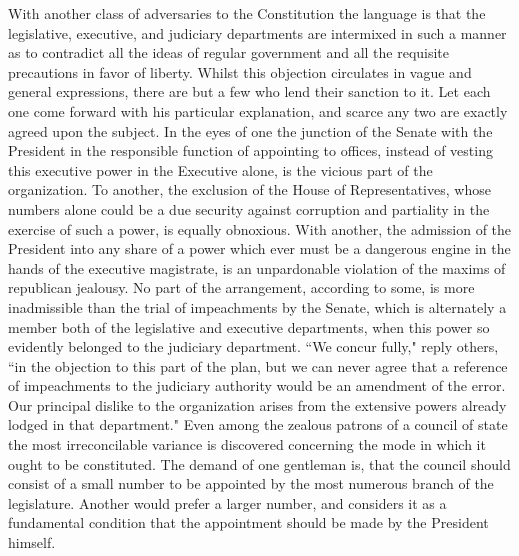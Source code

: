 With another class of adversaries to the Constitution the language is that the legislative, executive, and judiciary departments are intermixed in such a manner as to contradict all the ideas of regular government and all the requisite precautions in favor of liberty. 
Whilst this objection circulates in vague and general expressions, there are but a few who lend their sanction to it. 
Let each one come forward with his particular explanation, and scarce any two are exactly agreed upon the subject. 
In the eyes of one the junction of the Senate with the President in the responsible function of appointing to offices, instead of vesting this executive power in the Executive alone, is the vicious part of the organization. 
To another, the exclusion of the House of Representatives, whose numbers alone could be a due security against corruption and partiality in the exercise of such a power, is equally obnoxious. 
With another, the admission of the President into any share of a power which ever must be a dangerous engine in the hands of the executive magistrate, is an unpardonable violation of the maxims of republican jealousy. 
No part of the arrangement, according to some, is more inadmissible than the trial of impeachments by the Senate, which is alternately a member both of the legislative and executive departments, when this power so evidently belonged to the judiciary department. 
``We concur fully," reply others, ``in the objection to this part of the plan, but we can never agree that a reference of impeachments to the judiciary authority would be an amendment of the error. 
Our principal dislike to the organization arises from the extensive powers already lodged in that department." Even among the zealous patrons of a council of state the most irreconcilable variance is discovered concerning the mode in which it ought to be constituted. 
The demand of one gentleman is, that the council should consist of a small number to be appointed by the most numerous branch of the legislature. 
Another would prefer a larger number, and considers it as a fundamental condition that the appointment should be made by the President himself.

